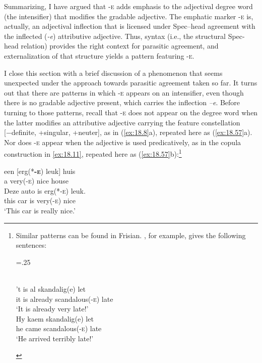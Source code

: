 \documentclass[output=paper]{langsci/langscibook}
\begin{document}
Summarizing, I have argued that \textsc{-e} adds emphasis to the adjectival
degree word (the intensifier) that modifies the      gradable adjective. The
emphatic marker \textsc{-e} is, actually, an adjectival inflection that is
licensed under Spec--head agreement with the inflected (\emph{-e}) attributive
adjective. Thus, syntax (i.e., the structural Spec-head relation) provides the
right context for parasitic agreement, and externalization of that structure
yields a pattern featuring \textsc{-e}.

I close this section with a brief discussion of a phenomenon that seems
unexpected under the approach towards parasitic agreement taken so far. It
turns out that there are patterns in which \textsc{-e} appears on an
intensifier, even though there is no gradable adjective present, which carries
the inflection \emph{–e}. Before turning to those patterns, recall that
\textsc{-e} does not appear on the degree word when the latter modifies an
attributive adjective carrying the feature constellation [−definite, +singular,
+neuter], as in (\ref{ex:18.8}a), repeated here as (\ref{ex:18.57}a). Nor does
\textsc{-e} appear when the adjective is used predicatively, as in the
copula
construction in \eqref{ex:18.11}, repeated here as
(\ref{ex:18.57}b):\footnote{Similar patterns can be found in Frisian.
    \citet{Verdenius1939}, for example, gives the following sentences:

\begin{exe}
    \multicolsep=.25\baselineskip
    \begin{multicols}{2}
    \\
	\gll 't is al skandalig(e) let\\
		it is already scandalous(\textsc{-e}) late\\
	\glt \enquote*{It is already very late!}
    \\
	\gll Hy kaem skandalig(e) let\\
		he came scandalous(\textsc{-e}) late\\
	\glt \enquote*{He arrived terribly late!}
	\end{multicols}
\end{exe}\label{fn:18.16}}

\ea%
    \label{ex:18.57}
	\ea
	\gll  een    [erg(*\textbf{\textsc{-e}})    leuk]  huis\\
		a          very(\textsc{-e})    nice    house\\
	\ex
	\gll Deze  auto    is    erg(*\textsc{-e})  leuk.\\
		this    car      is    very(\textsc{-e})    nice\\
	\glt \enquote*{This car is really nice.}
	\z
\z
\end{document}
